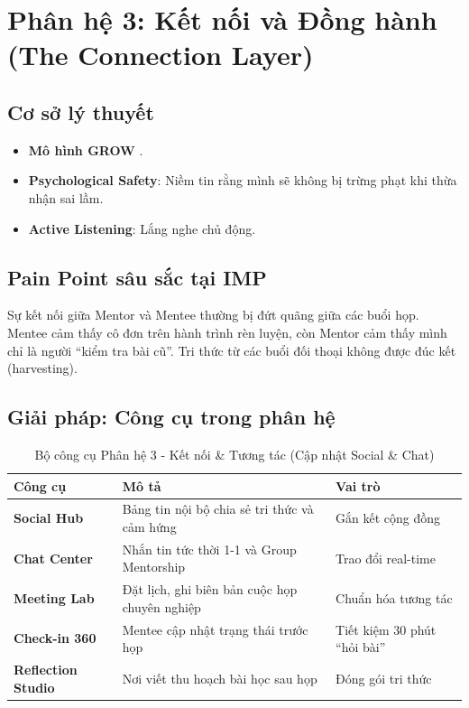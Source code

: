 \section{Phân hệ 3: Kết nối và Đồng hành (The Connection Layer)}

\subsection{Cơ sở lý thuyết}
\begin{itemize}
  \item \textbf{Mô hình GROW} \citep{grow2009}.
  \item \textbf{Psychological Safety}: Niềm tin rằng mình sẽ không bị trừng phạt khi thừa nhận sai lầm.
  \item \textbf{Active Listening}: Lắng nghe chủ động.
\end{itemize}

\subsection{Pain Point sâu sắc tại IMP}
Sự kết nối giữa Mentor và Mentee thường bị đứt quãng giữa các buổi họp. Mentee cảm thấy cô đơn trên hành trình rèn luyện, còn Mentor cảm thấy mình chỉ là người ``kiểm tra bài cũ''. Tri thức từ các buổi đối thoại không được đúc kết (harvesting).

\subsection{Giải pháp: Công cụ trong phân hệ}

\begin{table}[H]
  \centering
  \begin{tabularx}{\textwidth}{|L|L|L|}
    \hline
     \textbf{\color{white} Công cụ} & \textbf{\color{white} Mô tả} & \textbf{\color{white} Vai trò} \\ \hline
    \textbf{Social Hub} & Bảng tin nội bộ chia sẻ tri thức và cảm hứng & Gắn kết cộng đồng \\ \hline
    \textbf{Chat Center} & Nhắn tin tức thời 1-1 và Group Mentorship & Trao đổi real-time \\ \hline
    \textbf{Meeting Lab} & Đặt lịch, ghi biên bản cuộc họp chuyên nghiệp & Chuẩn hóa tương tác \\ \hline
    \textbf{Check-in 360} & Mentee cập nhật trạng thái trước họp & Tiết kiệm 30 phút ``hỏi bài'' \\ \hline
    \textbf{Reflection Studio} & Nơi viết thu hoạch bài học sau họp & Đóng gói tri thức \\ \hline
  \end{tabularx}
  \caption{Bộ công cụ Phân hệ 3 - Kết nối \& Tương tác (Cập nhật Social \& Chat)}
\end{table}

